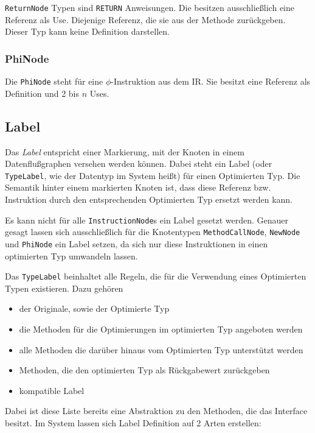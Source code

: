 \texttt{ReturnNode} Typen sind \texttt{RETURN} Anweisungen. Die besitzen 
ausschließlich eine Referenz als Use. Diejenige Referenz, die sie aus der Methode 
zurückgeben. Dieser Typ kann keine Definition darstellen.

\subsubsection{PhiNode}

Die \texttt{PhiNode} steht für eine $\phi$-Instruktion aus dem IR. Sie besitzt eine
Referenz als Definition und 2 bis $n$ Uses.

\subsection{Label}

Das \textit{Label} entspricht einer Markierung, mit der Knoten in einem 
Datenflußgraphen versehen werden können. Dabei steht ein Label (oder 
\texttt{TypeLabel}, wie der Datentyp im System heißt) für einen Optimierten Typ.
Die Semantik hinter einem markierten Knoten ist, dass diese Referenz bzw. Instruktion
durch den entsprechenden Optimierten Typ ersetzt werden kann.

Es kann nicht für alle \texttt{InstructionNode}s ein Label gesetzt werden. Genauer
gesagt lassen sich ausschließlich für die Knotentypen \texttt{MethodCallNode}, 
\texttt{NewNode} und \texttt{PhiNode} ein Label setzen, da sich nur diese 
Instruktionen in einen optimierten Typ umwandeln lassen.

Das \texttt{TypeLabel} beinhaltet alle Regeln, die für die Verwendung eines
Optimierten Typen existieren. Dazu gehören

\begin{itemize}
	\item der Originale, sowie der Optimierte Typ
	\item die Methoden für die Optimierungen im optimierten Typ angeboten werden
	\item alle Methoden die darüber hinaus vom Optimierten Typ unterstützt werden
	\item Methoden, die den optimierten Typ als Rückgabewert zurückgeben
	\item kompatible Label
\end{itemize}

Dabei ist diese Liste bereits eine Abstraktion zu den Methoden, die das Interface 
besitzt. Im System lassen sich Label Definition auf 2 Arten erstellen:

